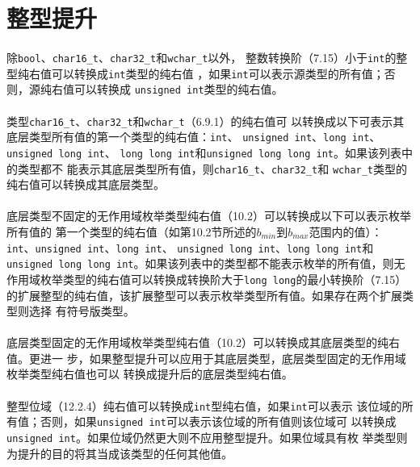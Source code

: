 \section{整型提升}
\paragraph{}
除\texttt{bool}、\texttt{char16\_t}、\texttt{char32\_t}和\texttt{wchar\_t}以外，
整数转换阶（7.15）小于\texttt{int}的整型纯右值可以转换成\texttt{int}类型的纯右值
，如果\texttt{int}可以表示源类型的所有值；否则，源纯右值可以转换成
\texttt{unsigned int}类型的纯右值。

\paragraph{}
类型\texttt{char16\_t}、\texttt{char32\_t}和\texttt{wchar\_t}（6.9.1）的纯右值可
以转换成以下可表示其底层类型所有值的第一个类型的纯右值：\texttt{int}、
\texttt{unsigned int}、\texttt{long int}、\texttt{unsigned long int}、
\texttt{long long int}和\texttt{unsigned long long int}。如果该列表中的类型都不
能表示其底层类型所有值，则\texttt{char16\_t}、\texttt{char32\_t}和
\texttt{wchar\_t}类型的纯右值可以转换成其底层类型。

\paragraph{}
底层类型不固定的无作用域枚举类型纯右值（10.2）可以转换成以下可以表示枚举所有值的
第一个类型的纯右值（如第10.2节所述的$b_{min}$到$b_{max}$范围内的值）：
\texttt{int}、\texttt{unsigned int}、\texttt{long int}、
\texttt{unsigned long int}、\texttt{long long int}和
\texttt{unsigned long long int}。如果该列表中的类型都不能表示枚举的所有值，则无
作用域枚举类型的纯右值可以转换成转换阶大于\texttt{long long}的最小转换阶（7.15）
的扩展整型的纯右值，该扩展整型可以表示枚举类型所有值。如果存在两个扩展类型则选择
有符号版类型。

\paragraph{}
底层类型固定的无作用域枚举类型纯右值（10.2）可以转换成其底层类型的纯右值。更进一
步，如果整型提升可以应用于其底层类型，底层类型固定的无作用域枚举类型纯右值也可以
转换成提升后的底层类型纯右值。

\paragraph{}
整型位域（12.2.4）纯右值可以转换成\texttt{int}型纯右值，如果\texttt{int}可以表示
该位域的所有值；否则，如果\texttt{unsigned int}可以表示该位域的所有值则该位域可
以转换成\texttt{unsigned int}。如果位域仍然更大则不应用整型提升。如果位域具有枚
举类型则为提升的目的将其当成该类型的任何其他值。

